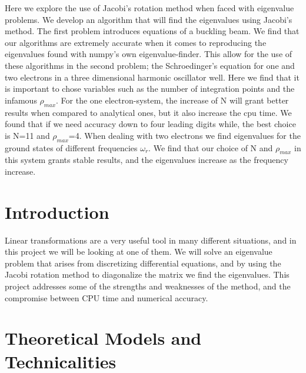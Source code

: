 \documentclass{article}
\begin{document}
Here we explore the use of Jacobi's rotation method when faced with eigenvalue problems. We develop an algorithm that will find the eigenvalues using Jacobi's method. The first problem introduces equations of a buckling beam. We find that our algorithms are extremely accurate when it comes to reproducing the eigenvalues found with numpy's own eigenvalue-finder.  This allow for the use of these algorithms in the second problem; the Schroedinger's equation for one and two electrons in a three dimensional harmonic oscillator well. Here we find that it is important to chose variables such as the number of integration points and the infamous $\rho_{max}$. For the one electron-system, the increase of N will grant better results when compared to analytical ones, but it also increase the cpu time. We found that if we need accuracy down to four leading digits while, the best choice is N=11 and $\rho_{max}$=4. When dealing with two electrons we find eigenvalues for the ground states of different frequencies $\omega_r$. We find that our choice of N and $\rho_{max}$ in this system grants stable results, and the eigenvalues increase as the frequency increase.

\section{Introduction}

Linear transformations are a very useful tool in many different situations, and in this project we will be looking at one of them. We will solve an eigenvalue problem that arises from discretizing differential equations, and by using the Jacobi rotation method to diagonalize the matrix we find the eigenvalues. This project addresses some of the strengths and weaknesses of the method, and the compromise between CPU time and numerical accuracy.



\section{Theoretical Models and Technicalities}
\end{document}
